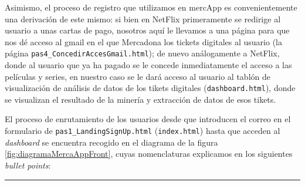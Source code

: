 \documentclass[a4paper,12pt]{report}
\begin{document}
	Asimismo, el proceso de registro que utilizamos en mercApp es convenientemente una derivación de este mismo: si bien en NetFlix primeramente se redirige al usuario a unas cartas de pago, nosotros aquí le llevamos a una página para que nos dé acceso al gmail en el que Mercadona los tickets digitales al usuario (la página  \texttt{pas4\_ConcedirAccesGmail.html}); de nuevo análogamente a NetFlix, donde al usuario que ya ha pagado se le concede inmediatamente el acceso a las películas y series,  en nuestro caso se le dará acceso al usuario al tablón de visualización de análisis de datos de los tikets digitales  (\texttt{dashboard.html}), donde se visualizan el resultado de la minería y extracción de datos de esos tikets. 
	
	El proceso de enrutamiento de los usuarios desde que introducen el correo en el formulario de \texttt{pas1\_LandingSignUp.html} (\texttt{index.html}) hasta que acceden al \textit{dashboard} se encuentra recogido en el diagrama de la figura \ref{fig:diagramaMercaAppFront}, cuyas nomenclaturas explicamos en los siguientes \textit{bullet points}:
	\vspace{1em}
	\hrule
	
\end{document}
